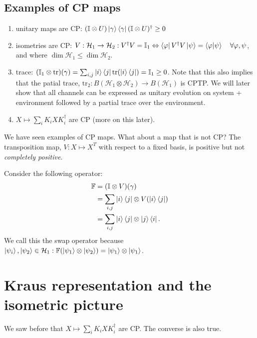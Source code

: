 \documentclass[10pt,oneside,longbibliography]{report}
\begin{document}
\subsection{Examples of CP maps}
\begin{enumerate}
    \item unitary maps are CP: $(\mathbb{I}\otimes U) \ket{\gamma} \bra{\gamma} (\mathbb{I}\otimes U)^{\dagger} \geq 0$
    \item isometries are CP: $V:\mathcal{H}_1 \rightarrow \mathcal{H}_2: V^{\dagger}V =\mathbb{I}_1 \Leftrightarrow \bra{\varphi} V^{\dagger}V \ket{\psi} = \braket{\varphi|\psi} \quad \forall \varphi,\psi$, and where $\dim\mathcal{H}_1 \leq \dim\mathcal{H}_2$.
    \item trace: $(\mathbb{I}_1 \otimes \text{tr})(\gamma) = \sum_{i,j} \ket{i}\bra{j} \text{tr}(\ket{i}\bra{j}) = \mathbb{I}_1 \geq 0 $. Note that this also implies that the patial trace, $\text{tr}_2: B(\mathcal{H}_1 \otimes \mathcal{H}_2) \rightarrow B(\mathcal{H}_1)$ is CPTP. We will later show that all channels can be expressed as unitary evolution on system + environment followed by a partial trace over the environment. 
    \item $X \mapsto \sum_i K_i X K_i^{\dagger}$ are CP (more on this later).
\end{enumerate}
We have seen examples of CP maps. What about a map that is not CP? The transposition map, $V:X\mapsto X^{T}$ with respect to a fixed basis, is positive but not \textit{completely positive}. 

Consider the following operator:
\begin{align}
    \mathbb{F}&=(\mathbb{I}\otimes V)(\gamma)\\
    &= \sum_{i,j}\ket{i}\bra{j} \otimes V(\ket{i}\bra{j})\\
    &= \sum_{i,j} \ket{i}\bra{j} \otimes \ket{j}\bra{i}.
\end{align}
We call this the swap operator because $\ket{\psi_i},\ket{\psi_2}\in \mathcal{H}_1: \mathbb{F}(\ket{\psi_1}\otimes \ket{\psi_2})=\ket{\psi_1}\otimes \ket{\psi_1}$. 

\section{Kraus representation and the isometric picture}
We saw before that $X\mapsto \sum_i K_i X K_i^{\dagger}$ are CP. The converse is also true. 
\end{document}
